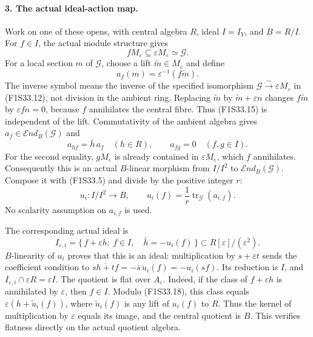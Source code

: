 \paragraph{3. The actual ideal-action map.}
Work on one of these opens, with central algebra
$R$, ideal $I=I_Y$, and $B=R/I$.
For $f\in I$, the actual module structure gives
\[
           fM_\varepsilon\subseteq
                      \varepsilon M_\varepsilon\simeq\mathcal G.
 \tag{F1S33.14}
\]
For a local section $m$ of $\mathcal G$, choose a
lift $\widetilde m\in M_\varepsilon$ and define
\[
       a_f(m)=\varepsilon^{-1}(f\widetilde m).
 \tag{F1S33.15}
\]
The inverse symbol means the inverse of the
specified isomorphism
$\mathcal G\xrightarrow{\sim}\varepsilon M_\varepsilon$
in (F1S33.12), not division in the ambient ring.
Replacing $\widetilde m$ by
$\widetilde m+\varepsilon n$ changes
$f\widetilde m$ by $\varepsilon fn=0$, because
$f$ annihilates the central fibre.
Thus (F1S33.15) is independent of the lift.
Commutativity of the ambient algebra gives
$a_f\in\mathcal End_B(\mathcal G)$ and
\[
 a_{hf}=\bar h\,a_f\quad(h\in R),\qquad
 a_{fg}=0\quad(f,g\in I).
 \tag{F1S33.16}
\]
For the second equality, $gM_\varepsilon$ is
already contained in $\varepsilon M_\varepsilon$,
which $f$ annihilates.
Consequently this is an actual $B$-linear
morphism from $I/I^2$ to
$\mathcal End_B(\mathcal G)$.
Compose it with (F1S33.5) and divide by the positive
integer $r$:
\[
 u_i:I/I^2\longrightarrow B,\qquad
          u_i(f)=\frac1r\operatorname{tr}_{\mathcal G}(a_{i,f}).
 \tag{F1S33.17}
\]
No scalarity assumption on $a_{i,f}$ is used.

The corresponding actual ideal is
\[
 I_{\varepsilon,i}
   =\{\,f+\varepsilon h:\ f\in I,\quad
                      \bar h=-u_i(f)\,\}
       \subset R[\varepsilon]/(\varepsilon^2).
 \tag{F1S33.18}
\]
$B$-linearity of $u_i$ proves that this is an ideal:
multiplication by $s+\varepsilon t$ sends the
coefficient condition to
$\overline{sh+tf}=-\bar s\,u_i(f)=-u_i(sf)$.
Its reduction is $I$, and
$I_{\varepsilon,i}\cap\varepsilon R=\varepsilon I$.
The quotient is flat over $A_\varepsilon$.
Indeed, if the class of $f+\varepsilon h$ is
annihilated by $\varepsilon$, then $f\in I$.
Modulo (F1S33.18), this class equals
$\varepsilon(h+\widetilde u_i(f))$, where
$\widetilde u_i(f)$ is any lift of $u_i(f)$ to $R$.
Thus the kernel of multiplication by $\varepsilon$
equals its image, and the central quotient is $B$.
This verifies flatness directly on the actual
quotient algebra.

